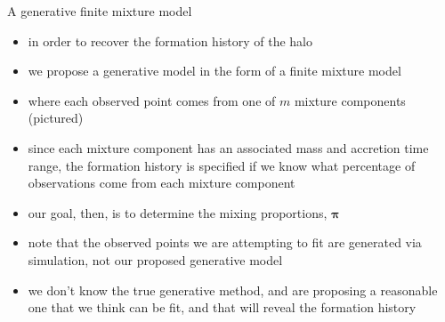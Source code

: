 \documentclass{beamer}
\newcommand{\vect}[1]{\boldsymbol{\mathbf{#1}}}
\newcommand{\vp}{\vect{\pi}}
\begin{document}
\begin{frame}[shrink]{A generative finite mixture model}
	
	\begin{itemize}
		
		
		\item in order to recover the formation history of the halo
		\item we propose a generative model in the form of a finite mixture model
		\item where each observed point comes from one of $m$ mixture components (pictured)
		\item since each mixture component has an associated mass and accretion time range, the formation history is specified if we know what percentage of observations come from each mixture component
		
		\item our goal, then, is to determine the mixing proportions, $\vp$
		
		\item note that the observed points we are attempting to fit are generated via simulation, not our proposed generative model
		\item we don't know the true generative method, and are proposing a reasonable one that we think can be fit, and that will reveal the formation history
	\end{itemize}
	
\end{frame}
\end{document}
